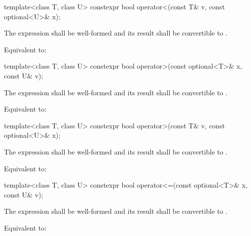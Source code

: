 %
\begin{itemdecl}
template<class T, class U> constexpr bool operator<(const T& v, const optional<U>& x);
\end{itemdecl}

\begin{itemdescr}
\pnum
\requires
The expression  shall be well-formed and
its result shall be convertible to .

\pnum
\effects
Equivalent to: 
\end{itemdescr}

%
\begin{itemdecl}
template<class T, class U> constexpr bool operator>(const optional<T>& x, const U& v);
\end{itemdecl}

\begin{itemdescr}
\pnum
\requires
The expression  shall be well-formed and
its result shall be convertible to .

\pnum
\effects
Equivalent to: 
\end{itemdescr}

%
\begin{itemdecl}
template<class T, class U> constexpr bool operator>(const T& v, const optional<U>& x);
\end{itemdecl}

\begin{itemdescr}
\pnum
\requires
The expression  shall be well-formed and
its result shall be convertible to .

\pnum
\effects
Equivalent to: 
\end{itemdescr}

%
\begin{itemdecl}
template<class T, class U> constexpr bool operator<=(const optional<T>& x, const U& v);
\end{itemdecl}

\begin{itemdescr}
\pnum
\requires
The expression  shall be well-formed and
its result shall be convertible to .

\pnum
\effects
Equivalent to: 
\end{itemdescr}

